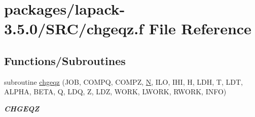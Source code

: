 \hypertarget{chgeqz_8f}{}\section{packages/lapack-\/3.5.0/\+S\+R\+C/chgeqz.f File Reference}
\label{chgeqz_8f}
\subsection*{Functions/\+Subroutines}
\begin{DoxyCompactItemize}
\item 
subroutine \hyperlink{group__complexGEcomputational_ga2c07ec6e7b75b527987e381674bdd68b}{chgeqz} (J\+O\+B, C\+O\+M\+P\+Q, C\+O\+M\+P\+Z, \hyperlink{polmisc_8c_a0240ac851181b84ac374872dc5434ee4}{N}, I\+L\+O, I\+H\+I, H, L\+D\+H, T, L\+D\+T, A\+L\+P\+H\+A, B\+E\+T\+A, Q, L\+D\+Q, Z, L\+D\+Z, W\+O\+R\+K, L\+W\+O\+R\+K, R\+W\+O\+R\+K, I\+N\+F\+O)
\begin{DoxyCompactList}\small\item\em {\bfseries C\+H\+G\+E\+Q\+Z} \end{DoxyCompactList}\end{DoxyCompactItemize}
